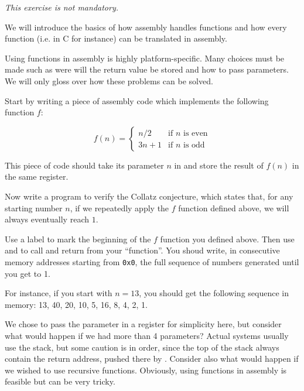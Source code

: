 \documentclass{../../tp}
\begin{document}
\begin{flushright}
	\small
	\itshape
	This exercise is not mandatory.
\end{flushright}
We will introduce the basics of how assembly handles functions and how every function (i.e. in C for instance) can be translated in assembly. 

Using functions in assembly is highly platform-specific. Many choices must be made such as were will the return value be stored and how to pass parameters. We will only gloss over how these problems can be solved. 

\begin{instruction}
	Start by writing a piece of assembly code which implements the following function $f$:
	
	\begin{equation*}
		f(n) = 
		\begin{cases}
			n/2 & \text{if $n$ is even} \\
			3n + 1 & \text{if $n$ is odd} 
		\end{cases}
	\end{equation*}
	
	This piece of code should take its parameter $n$ in  and store the result of $f(n)$ in the same register.
	
	Now write a program to verify the Collatz conjecture, which states that, for any starting number $n$, if we repeatedly apply the $f$ function defined above, we will always eventually reach $1$.
	
	Use a label to mark the beginning of the $f$ function you defined above. Then use  and  to call and return from your ``function''. You shoud write, in consecutive memory addresses starting from \texttt{0x0}, the full sequence of numbers generated until you get to 1. 
	
	For instance, if you start with $n = 13$, you should get the following sequence in memory:
	13, 40, 20, 10, 5, 16, 8, 4, 2, 1.
	
\end{instruction}


We chose to pass the parameter in a register for simplicity here, but consider what would happen if we had more than 4 parameters? Actual systems usually use the stack, but some caution is in order, since the top of the stack always contain the return address, pushed there by . Consider also what would happen if we wished to use recursive functions. Obviously, using functions in assembly is feasible but can be very tricky.
\end{document}
